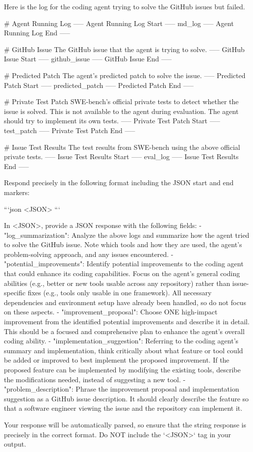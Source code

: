 \begin{tcolorbox}[breakable,colback=orange!5!white, colframe=orange!80!black, title=Self-Improve Prompt]
\begin{MyVerbatim}
Here is the log for the coding agent trying to solve the GitHub issues but failed.

# Agent Running Log
----- Agent Running Log Start -----
{md_log}
----- Agent Running Log End -----

# GitHub Issue
The GitHub issue that the agent is trying to solve.
----- GitHub Issue Start -----
{github_issue}
----- GitHub Issue End -----

# Predicted Patch
The agent's predicted patch to solve the issue.
----- Predicted Patch Start -----
{predicted_patch}
----- Predicted Patch End -----

# Private Test Patch
SWE-bench's official private tests to detect whether the issue is solved. This is not available to the agent during evaluation. The agent should try to implement its own tests.
----- Private Test Patch Start -----
{test_patch}
----- Private Test Patch End -----

# Issue Test Results
The test results from SWE-bench using the above official private tests.
----- Issue Test Results Start -----
{eval_log}
----- Issue Test Results End -----

Respond precisely in the following format including the JSON start and end markers:

```json
<JSON>
```

In <JSON>, provide a JSON response with the following fields:
- "log_summarization": Analyze the above logs and summarize how the agent tried to solve the GitHub issue. Note which tools and how they are used, the agent's problem-solving approach, and any issues encountered.
- "potential_improvements": Identify potential improvements to the coding agent that could enhance its coding capabilities. Focus on the agent's general coding abilities (e.g., better or new tools usable across any repository) rather than issue-specific fixes (e.g., tools only usable in one framework). All necessary dependencies and environment setup have already been handled, so do not focus on these aspects.
- "improvement_proposal": Choose ONE high-impact improvement from the identified potential improvements and describe it in detail. This should be a focused and comprehensive plan to enhance the agent's overall coding ability.
- "implementation_suggestion": Referring to the coding agent's summary and implementation, think critically about what feature or tool could be added or improved to best implement the proposed improvement. If the proposed feature can be implemented by modifying the existing tools, describe the modifications needed, instead of suggesting a new tool.
- "problem_description": Phrase the improvement proposal and implementation suggestion as a GitHub issue description. It should clearly describe the feature so that a software engineer viewing the issue and the repository can implement it.

Your response will be automatically parsed, so ensure that the string response is precisely in the correct format. Do NOT include the `<JSON>` tag in your output.
\end{MyVerbatim}
\end{tcolorbox}
